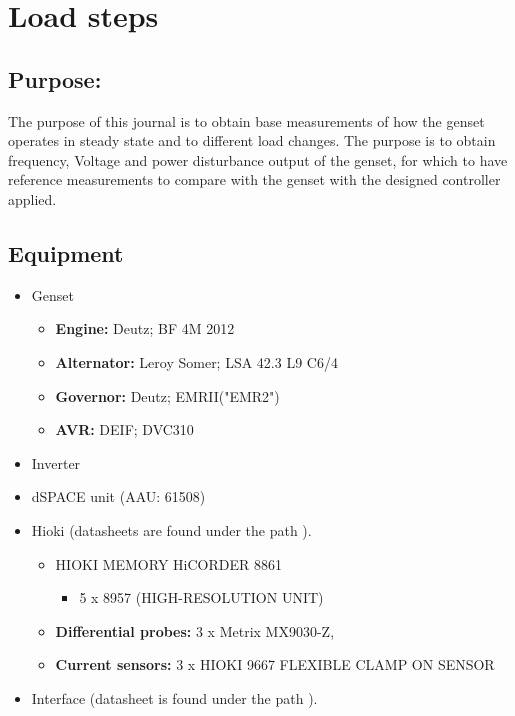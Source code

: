 \section{Load steps}
\label{app:load_steps}
\subsection*{Purpose:}
The purpose of this journal is to obtain base measurements of how the genset operates in steady state and to different load changes. The purpose is to obtain frequency, Voltage and power disturbance output of the genset, for which to have reference measurements to compare with the genset with the designed controller applied.   

\subsection*{Equipment}

\begin{itemize}
	\item Genset
		\begin{itemize}
			\item \textbf{Engine:} Deutz; BF 4M 2012
			\item \textbf{Alternator:} Leroy Somer; LSA 42.3 L9 C6/4
			\item \textbf{Governor:} Deutz; EMRII("EMR2")
			\item \textbf{AVR:} DEIF; DVC310 
		\end{itemize}
		\item Inverter
		\item dSPACE unit (AAU: 61508)
		\item Hioki (datasheets are found under the path ).
		\begin{itemize}
			\item HIOKI MEMORY HiCORDER 8861
			\begin{itemize}
				\item 5 x 8957 (HIGH-RESOLUTION UNIT)
			\end{itemize}
			\item \textbf{Differential probes:} 3 x Metrix MX9030-Z,
			\item \textbf{Current sensors:} 3 x HIOKI 9667 FLEXIBLE CLAMP ON SENSOR
		\end{itemize}
		\item Interface (datasheet is found under the path ).
\end{itemize}	


